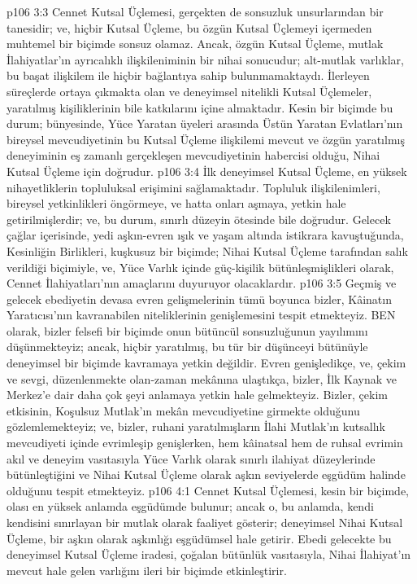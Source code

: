 \vs p106 3:3 Cennet Kutsal Üçlemesi, gerçekten de sonsuzluk unsurlarından bir tanesidir; ve, hiçbir Kutsal Üçleme, bu özgün Kutsal Üçlemeyi içermeden muhtemel bir biçimde sonsuz olamaz. Ancak, özgün Kutsal Üçleme, mutlak İlahiyatlar’ın ayrıcalıklı ilişkileniminin bir nihai sonucudur; alt\hyp{}mutlak varlıklar, bu başat ilişkilem ile hiçbir bağlantıya sahip bulunmamaktaydı. İlerleyen süreçlerde ortaya çıkmakta olan ve deneyimsel nitelikli Kutsal Üçlemeler, yaratılmış kişiliklerinin bile katkılarını içine almaktadır. Kesin bir biçimde bu durum; bünyesinde, Yüce Yaratan üyeleri arasında Üstün Yaratan Evlatları’nın bireysel mevcudiyetinin bu Kutsal Üçleme ilişkilemi  mevcut ve özgün yaratılmış deneyiminin eş zamanlı gerçekleşen mevcudiyetinin habercisi olduğu, Nihai Kutsal Üçleme için doğrudur.
\vs p106 3:4 İlk deneyimsel Kutsal Üçleme, en yüksek nihayetliklerin topluluksal erişimini sağlamaktadır. Topluluk ilişkilenimleri, bireysel yetkinlikleri öngörmeye, ve hatta onları aşmaya, yetkin hale getirilmişlerdir; ve, bu durum, sınırlı düzeyin ötesinde bile doğrudur. Gelecek çağlar içerisinde, yedi aşkın\hyp{}evren ışık ve yaşam altında istikrara kavuştuğunda, Kesinliğin Birlikleri, kuşkusuz bir biçimde; Nihai Kutsal Üçleme tarafından salık verildiği biçimiyle, ve, Yüce Varlık içinde güç\hyp{}kişilik bütünleşmişlikleri olarak, Cennet İlahiyatları’nın amaçlarını duyuruyor olacaklardır.
\vs p106 3:5 Geçmiş ve gelecek ebediyetin devasa evren gelişmelerinin tümü boyunca bizler, Kâinatın Yaratıcısı’nın kavranabilen niteliklerinin genişlemesini tespit etmekteyiz. BEN olarak, bizler felsefi bir biçimde onun bütüncül sonsuzluğunun yayılımını düşünmekteyiz; ancak, hiçbir yaratılmış, bu tür bir düşünceyi bütünüyle deneyimsel bir biçimde kavramaya yetkin değildir. Evren genişledikçe, ve, çekim ve sevgi, düzenlenmekte olan\hyp{}zaman mekânına ulaştıkça, bizler, İlk Kaynak ve Merkez’e dair daha çok şeyi anlamaya yetkin hale gelmekteyiz. Bizler, çekim etkisinin, Koşulsuz Mutlak’ın mekân mevcudiyetine girmekte olduğunu gözlemlemekteyiz; ve, bizler, ruhani yaratılmışların İlahi Mutlak’ın kutsallık mevcudiyeti içinde evrimleşip genişlerken, hem kâinatsal hem de ruhsal evrimin akıl ve deneyim vasıtasıyla Yüce Varlık olarak sınırlı ilahiyat düzeylerinde bütünleştiğini ve Nihai Kutsal Üçleme olarak aşkın seviyelerde eşgüdüm halinde olduğunu tespit etmekteyiz.
\vs p106 4:1 Cennet Kutsal Üçlemesi, kesin bir biçimde, olası en yüksek anlamda eşgüdümde bulunur; ancak o, bu anlamda, kendi kendisini sınırlayan bir mutlak olarak faaliyet gösterir; deneyimsel Nihai Kutsal Üçleme, bir aşkın olarak aşkınlığı eşgüdümsel hale getirir. Ebedi gelecekte bu deneyimsel Kutsal Üçleme iradesi, çoğalan bütünlük vasıtasıyla, Nihai İlahiyat’ın mevcut hale gelen varlığını ileri bir biçimde etkinleştirir.
